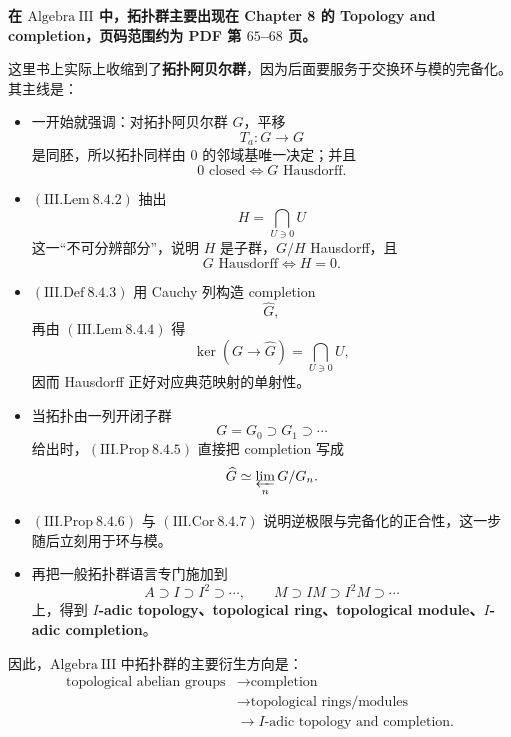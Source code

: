 \documentclass[a4paper]{ctexart}
\theoremstyle{definition}
\theoremstyle{analysis}
\theoremstyle{plain}
\begin{document}
\medskip

\textbf{在 \(\mathrm{Algebra\ III}\) 中，拓扑群主要出现在 Chapter 8 的 Topology and completion，页码范围约为 PDF 第 \(65\)--\(68\) 页。}

这里书上实际上收缩到了\textbf{拓扑阿贝尔群}，因为后面要服务于交换环与模的完备化。其主线是：
\begin{itemize}
  \item 一开始就强调：对拓扑阿贝尔群 \(G\)，平移
  \[
    T_a:G\to G
  \]
  是同胚，所以拓扑同样由 \(0\) 的邻域基唯一决定；并且
  \[
    0\text{ closed}\iff G\text{ Hausdorff}.
  \]
  \item \((\mathrm{III.Lem}\ 8.4.2)\) 抽出
  \[
    H=\bigcap_{U\ni 0}U
  \]
  这一“不可分辨部分”，说明 \(H\) 是子群，\(G/H\) Hausdorff，且
  \[
    G\text{ Hausdorff}\iff H=0.
  \]
  \item \((\mathrm{III.Def}\ 8.4.3)\) 用 Cauchy 列构造 completion
  \[
    \widehat G,
  \]
  再由 \((\mathrm{III.Lem}\ 8.4.4)\) 得
  \[
    \ker(G\to \widehat G)=\bigcap_{U\ni 0}U,
  \]
  因而 Hausdorff 正好对应典范映射的单射性。
  \item 当拓扑由一列开闭子群
  \[
    G=G_0\supset G_1\supset \cdots
  \]
  给出时，\((\mathrm{III.Prop}\ 8.4.5)\) 直接把 completion 写成
  \[
    \widehat G\simeq \varprojlim_n G/G_n.
  \]
  \item \((\mathrm{III.Prop}\ 8.4.6)\) 与 \((\mathrm{III.Cor}\ 8.4.7)\) 说明逆极限与完备化的正合性，这一步随后立刻用于环与模。
  \item 再把一般拓扑群语言专门施加到
  \[
    A\supset I\supset I^2\supset \cdots,\qquad
    M\supset IM\supset I^2M\supset \cdots
  \]
  上，得到 \textbf{\(I\)-adic topology、topological ring、topological module、\(I\)-adic completion}。
\end{itemize}

因此，\(\mathrm{Algebra\ III}\) 中拓扑群的主要衍生方向是：
\[
  \begin{aligned}
    \text{topological abelian groups}
    &\longrightarrow
    \text{completion} \\
    &\longrightarrow
    \text{topological rings/modules} \\
    &\longrightarrow
    I\text{-adic topology and completion}.
  \end{aligned}
\]

\medskip
\end{document}
